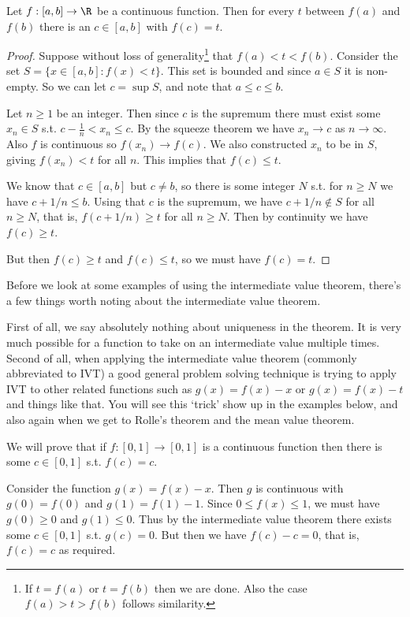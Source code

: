 \begin{theorem}
	Let $f: [a, b] \rightarrow \R$ be a continuous function. Then for every $t$ between $f(a)$ and $f(b)$ there is an $c \in [a, b]$ with $f(c) = t$.
\end{theorem}
\begin{proof}
Suppose without loss of generality\footnote{If $t = f(a)$ or $t = f(b)$ then we are done. Also the case $f(a)> t> f(b)$ follows similarity.} that $f(a) < t < f(b)$. Consider the set $S = \{x \in [a, b] : f(x) < t\}$. This set is bounded and since $a \in S$ it is non-empty. So we can let $c = \sup S$, and note that $a \leq c \leq b$.

Let $n \geq 1$ be an integer. Then since $c$ is the supremum there must exist some $x_n \in S$ s.t. $c - \frac{1}{n} < x_n \leq c$. 
By the squeeze theorem we have $x_n \rightarrow c$ as $n \rightarrow \infty$.
Also $f$ is continuous so $f(x_n) \rightarrow f(c)$. 
We also constructed $x_n$ to be in $S$, giving $f(x_n) < t$ for all $n$. This implies that $f(c) \leq t$. 

We know that $c \in [a, b]$ but $c \neq b$, so there is some integer $N$ s.t. for $n \geq N$ we have $c + 1/n \leq b$.
Using that $c$ is the supremum, we have $c + 1/n \not \in S$ for all $n \geq N$, that is, $f(c + 1/n) \geq t$ for all $n\geq N$.
Then by continuity we have $f(c) \geq t$. 

But then $f(c) \geq t$ and $f(c) \leq t$, so we must have $f(c) = t$.
\end{proof}

Before we look at some examples of using the intermediate value theorem, there's a few things worth noting about the intermediate value theorem.

First of all, we say absolutely nothing about uniqueness in the theorem. It is very much possible for a function to take on an intermediate value multiple times.
Second of all, when applying the intermediate value theorem (commonly abbreviated to IVT) a good general problem solving technique is trying to apply IVT to other related functions such as $g(x) = f(x) - x$ or $g(x) = f(x) - t$ and things like that. You will see this `trick' show up in the examples below, and also again when we get to Rolle's theorem and the mean value theorem.


\begin{example}
	We will prove that if $f:[0, 1] \rightarrow [0, 1]$ is a continuous function then there is some $c \in [0, 1]$ s.t. $f(c)=c$.

	Consider the function $g(x) = f(x) - x$. Then $g$ is continuous with $g(0) = f(0)$ and $g(1) = f(1) - 1$. 
	Since $0 \leq f(x) \leq 1$, we must have $g(0) \geq 0$ and $g(1) \leq 0$. Thus by the intermediate value theorem there exists some $c \in [0, 1]$ s.t. $g(c) = 0$. But then we have $f(c) - c = 0$, that is, $f(c) = c$ as required.
\end{example}

